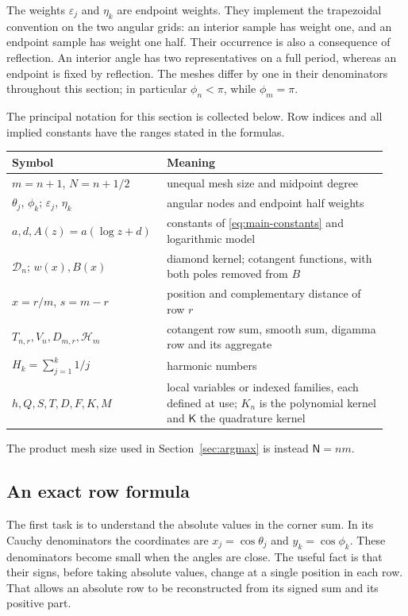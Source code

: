 The weights $\varepsilon_j$ and $\eta_k$ are endpoint weights.
They implement the trapezoidal convention on the two angular grids:
an interior sample has weight one, and an endpoint sample has weight
one half. Their occurrence is also a consequence of reflection.
An interior angle has two representatives on a full period, whereas
an endpoint is fixed by reflection. The meshes differ by one in their
denominators throughout this section; in particular $\phi_n<\pi$,
while $\phi_m=\pi$.


The principal notation for this section is collected below. Row indices
and all implied constants have the ranges stated in the formulas.
\begin{center}
\begin{tabular}{@{}p{0.36\linewidth}p{0.58\linewidth}@{}}
\toprule
Symbol & Meaning\\
\midrule
$m=n+1$, $N=n+1/2$ & unequal mesh size and midpoint degree\\
$\theta_j$, $\phi_k$; $\varepsilon_j$, $\eta_k$ & angular nodes and endpoint half weights\\
$a,d,A(z)=a(\log z+d)$ & constants of \eqref{eq:main-constants} and logarithmic model\\
$\mathcal D_n$; $w(x),B(x)$ & diamond kernel; cotangent functions, with both poles removed from $B$\\
$x=r/m$, $s=m-r$ & position and complementary distance of row $r$\\
$T_{n,r},V_n,D_{m,r},\mathcal H_m$ & cotangent row sum, smooth sum, digamma row and its aggregate\\
$H_k=\sum_{j=1}^k1/j$ & harmonic numbers\\
$h,Q,S,T,D,F,K,M$ & local variables or indexed families, each defined at use;
$K_n$ is the polynomial kernel and $\mathsf K$ the quadrature kernel\\
\bottomrule
\end{tabular}
\end{center}
The product mesh size used in Section~\ref{sec:argmax} is instead
$\mathsf N=nm$.

\subsection{An exact row formula}

The first task is to understand the absolute values in the corner
sum. In its Cauchy denominators the coordinates are
$x_j=\cos\theta_j$ and $y_k=\cos\phi_k$.
These denominators become small when the angles
are close. The useful fact is that their signs, before taking absolute
values, change at a single position in each row. That allows an
absolute row to be reconstructed from its signed sum and its positive
part.

